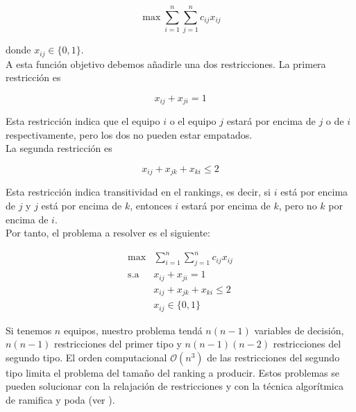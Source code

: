 \begin{equation}
\max \sum_{i=1}^{n} \sum_{j=1}^{n} c_{ij} x_{ij}
\end{equation}

donde $x_{ij} \in \{0,1\}$.\\

A esta función objetivo debemos añadirle una dos restricciones. La primera restricción es

\begin{equation}
x_{ij} + x_{ji} = 1
\end{equation}

Esta restricción indica que el equipo $i$ o el equipo $j$ estará por encima de $j$ o de $i$ respectivamente, pero los dos no pueden estar empatados.\\

La segunda restricción es 

\begin{equation}
x_{ij} + x_{jk} + x_{ki} \leq 2
\end{equation}

Esta restricción indica transitividad en el rankings, es decir, si $i$ está por encima de $j$ y $j$ está por encima de $k$, entonces $i$ estará por encima de $k$, pero no $k$ por encima de $i$.\\

Por tanto, el problema a resolver es el siguiente:

\begin{equation}
\begin{array}{rl}
\max         & \sum\limits_{i=1}^{n} \sum\limits_{j=1}^{n} c_{ij} x_{ij}\\
\mathrm{s.a} & x_{ij} + x_{ji} = 1\\
             & x_{ij} + x_{jk} + x_{ki} \leq 2\\
             & x_{ij} \in \{0,1\}
\end{array}
\end{equation}

Si tenemos $n$ equipos, nuestro problema tendá $n(n-1)$ variables de decisión, $n(n-1)$ restricciones del primer tipo y $n(n-1)(n-2)$ restricciones del segundo tipo. El orden computacional $\mathcal{O}(n^3)$ de las restricciones del segundo tipo limita el problema del tamaño del ranking a producir. Estos problemas se pueden solucionar con la relajación de restricciones y con la técnica algorítmica de ramifica y poda (ver \cite[pág 190-192]{langville2012s}).

